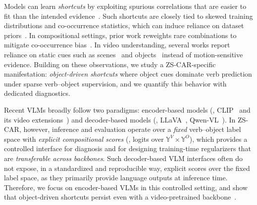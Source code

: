 Models can learn \emph{shortcuts} by exploiting spurious correlations that are easier to fit than the intended evidence~\cite{geirhos2018cuecon,ilyas2019adversarial,nam2020lff,scimeca2022shortcut}.
Such shortcuts are closely tied to skewed training distributions and co-occurrence statistics, which can induce reliance on dataset priors~\cite{agrawal2018dont,singh2020dont}.
In compositional settings, prior work reweights rare combinations to mitigate co-occurrence bias~\cite{kim2023hierarchical}.
In video understanding, several works report reliance on static cues such as scenes~\cite{whycantchoi, wang2021be, ding2022fame, bae2024devias} and objects~\cite{bahng2019rebias, chatterjee2023oap} instead of motion-sensitive evidence.
Building on these observations, we study a ZS-CAR-specific manifestation: \emph{object-driven shortcuts} where object cues dominate verb prediction under sparse verb--object supervision, and we quantify this behavior with dedicated diagnostics.




Recent VLMs broadly follow two paradigms: encoder-based models (\eg, CLIP~\cite{radford2021clip} and its video extensions~\cite{ma2022xclip,li2023unmasked,zhao2024videoprism,wang2024iv2}) 
and decoder-based models (\eg, LLaVA~\cite{liu2023llava}, Qwen-VL~\cite{bai2025qwen25vl}).
In ZS-CAR, however, inference and evaluation operate over a \emph{fixed} verb--object label space with \emph{explicit compositional scores} (\ie, logits over $\mathbb{Y}^V \times \mathbb{Y}^O$), which provides a controlled interface for diagnosis and for designing training-time regularizers that are \emph{transferable across backbones}.
Such decoder-based VLM interfaces often do not expose, in a standardized and reproducible way, explicit scores over the fixed label space, as they primarily provide language outputs at inference time.
Therefore, we focus on encoder-based VLMs in this controlled setting, and show that object-driven shortcuts persist even with a video-pretrained backbone~\cite{wang2024iv2}. 

